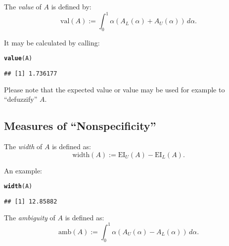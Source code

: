 \documentclass[11pt]{article}\usepackage{graphicx, color}
\makeatletter
\newcommand{\hlfunctioncall}[1]{\textcolor[rgb]{0.501960784313725,0,0.329411764705882}{\textbf{#1}}}%
\newenvironment{kframe}{%
 \def\at@end@of@kframe{}%
 \ifinner\ifhmode%
  \def\at@end@of@kframe{\end{minipage}}%
  \begin{minipage}{\columnwidth}%
 \fi\fi%
 \def\FrameCommand##1{\hskip\@totalleftmargin \hskip-\fboxsep
 \colorbox{shadecolor}{##1}\hskip-\fboxsep
     \hskip-\linewidth \hskip-\@totalleftmargin \hskip\columnwidth}%
 \MakeFramed {\advance\hsize-\width
   \@totalleftmargin\z@ \linewidth\hsize
   \@setminipage}}%
 {\par\unskip\endMakeFramed%
 \at@end@of@kframe}
\newenvironment{knitrout}{}{} %
\makeatother
\begin{document}
\bigskip
The \textit{value} of $A$ \cite{DelgadoETAL1998} is defined by:
\begin{equation}
\mathrm{val}(A) := \int_0^1 \alpha\left(A_L(\alpha)+A_U(\alpha)\right)\,d\alpha.
\end{equation}

\noindent
It may be calculated by calling:

\begin{knitrout}\small
{}\color{fgcolor}\begin{kframe}
\begin{alltt}
\hlfunctioncall{value}(A)
\end{alltt}
\begin{verbatim}
## [1] 1.736177
\end{verbatim}
\end{kframe}
\end{knitrout}


\noindent
Please note that the expected value or  value
may be used for example to ``defuzzify'' $A$.


\subsection{Measures of ``Nonspecificity''}


The \textit{width} of $A$ \cite{Chanas2001} is defined as:
\begin{equation}
\mathrm{width}(A) := \mathrm{EI}_U(A) - \mathrm{EI}_L(A).
\end{equation}

\noindent
An example:

\begin{knitrout}\small
{}\color{fgcolor}\begin{kframe}
\begin{alltt}
\hlfunctioncall{width}(A)
\end{alltt}
\begin{verbatim}
## [1] 12.85882
\end{verbatim}
\end{kframe}
\end{knitrout}


\bigskip
The \textit{ambiguity} of $A$ \cite{DelgadoETAL1998} is defined as:
\begin{equation}
\mathrm{amb}(A) := \int_0^1 \alpha\left(A_U(\alpha)-A_L(\alpha)\right)\,d\alpha.
\end{equation}
\end{document}
